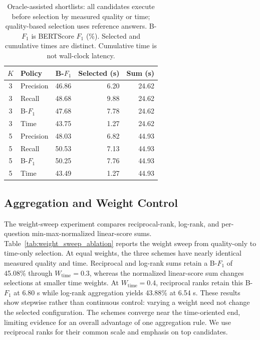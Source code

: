 \begin{table}[tb]
\centering\small
\caption{Oracle-assisted shortlists: all candidates execute before selection by measured quality or time; quality-based selection uses reference answers. B-$F_1$ is BERTScore $F_1$ (\%). Selected and cumulative times are distinct. Cumulative time is not wall-clock latency.}
\label{Evaluation_of_RAG_Based_on_Selection_Results_max}
\setlength{\tabcolsep}{3pt}
\begin{tabular}{clrrr}
\toprule
$K$ & Policy & B-$F_1$ & Selected (s) & Sum (s) \\
\midrule
3 & Precision & 46.86 & 6.20 & 24.62 \\
3 & Recall & 48.68 & 9.88 & 24.62 \\
3 & B-$F_1$ & 47.68 & 7.78 & 24.62 \\
3 & Time & 43.75 & 1.27 & 24.62 \\
\midrule
5 & Precision & 48.03 & 6.82 & 44.93 \\
5 & Recall & 50.53 & 7.13 & 44.93 \\
5 & B-$F_1$ & 50.25 & 7.76 & 44.93 \\
5 & Time & 43.49 & 1.27 & 44.93 \\
\bottomrule
\end{tabular}
\end{table}

\subsection{Aggregation and Weight Control} \label{sec5.4.1}
The weight-sweep experiment compares reciprocal-rank, log-rank, and per-question min-max-normalized linear-score sums. Table~\ref{tab:weight_sweep_ablation} reports the weight sweep from quality-only to time-only selection. At equal weights, the three schemes have nearly identical measured quality and time. Reciprocal and log-rank sums retain a B-$F_1$ of 45.08\% through $W_{\mathrm{time}}=0.3$, whereas the normalized linear-score sum changes selections at smaller time weights. At $W_{\mathrm{time}}=0.4$, reciprocal ranks retain this B-$F_1$ at 6.80 s while log-rank aggregation yields 43.88\% at 6.54 s. These results show stepwise rather than continuous control: varying a weight need not change the selected configuration. The schemes converge near the time-oriented end, limiting evidence for an overall advantage of one aggregation rule. We use reciprocal ranks for their common scale and emphasis on top candidates.

